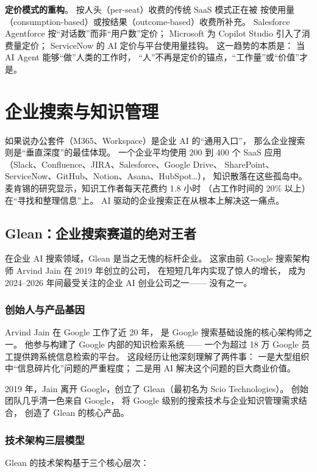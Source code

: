 \textbf{定价模式的重构}。
按人头（per-seat）收费的传统 SaaS 模式正在被
按使用量（consumption-based）或按结果（outcome-based）收费所补充。
Salesforce Agentforce 按``对话数''而非``用户数''定价；
Microsoft 为 Copilot Studio 引入了消费量定价；
ServiceNow 的 AI 定价与平台使用量挂钩。
这一趋势的本质是：
当 AI Agent 能够``做''人类的工作时，
``人''不再是定价的锚点，``工作量''或``价值''才是。


\section{企业搜索与知识管理}
\label{sec:ent-search}

如果说办公套件（M365、Workspace）是企业 AI 的``通用入口''，
那么企业搜索则是``垂直深度''的最佳体现。
一个企业平均使用 200 到 400 个 SaaS 应用
（Slack、Confluence、JIRA、Salesforce、Google Drive、
SharePoint、ServiceNow、GitHub、Notion、Asana、HubSpot\ldots），
知识散落在这些孤岛中。
麦肯锡的研究显示，知识工作者每天花费约 1.8 小时
（占工作时间的 20\% 以上）在``寻找和整理信息''上。
AI 驱动的企业搜索正在从根本上解决这一痛点。

\subsection{Glean：企业搜索赛道的绝对王者}

在企业 AI 搜索领域，Glean 是当之无愧的标杆企业。
这家由前 Google 搜索架构师 Arvind Jain 在 2019 年创立的公司，
在短短几年内实现了惊人的增长，
成为 2024--2026 年间最受关注的企业 AI 创业公司之一——
没有之一。

\subsubsection{创始人与产品基因}
Arvind Jain 在 Google 工作了近 20 年，
是 Google 搜索基础设施的核心架构师之一。
他参与构建了 Google 内部的知识检索系统——
一个为超过 18 万 Google 员工提供跨系统信息检索的平台。
这段经历让他深刻理解了两件事：
一是大型组织中``信息碎片化''问题的严重程度；
二是用 AI 解决这个问题的巨大商业价值。

2019 年，Jain 离开 Google，创立了 Glean（最初名为 Scio Technologies）。
创始团队几乎清一色来自 Google，
将 Google 级别的搜索技术与企业知识管理需求结合，
创造了 Glean 的核心产品。

\subsubsection{技术架构三层模型}
Glean 的技术架构基于三个核心层次：

